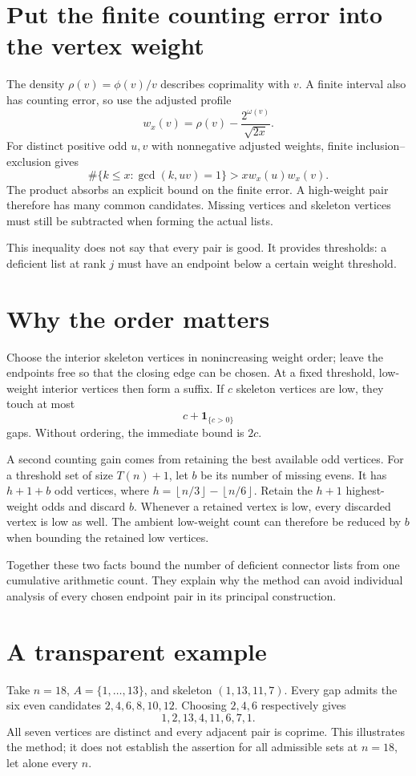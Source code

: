 \documentclass[11pt,letterpaper]{article}
\theoremstyle{remark}\newtheorem{remark}[theorem]{Remark}
\newcommand{\ind}{\mathbf 1}
\newcommand{\floor}[1]{\left\lfloor#1\right\rfloor}
\begin{document}
\section{Put the finite counting error into the vertex weight}
The density $\rho(v)=\phi(v)/v$ describes coprimality with $v$. A finite interval also has counting error, so use the adjusted profile
\[
 w_x(v)=\rho(v)-\frac{2^{\omega(v)}}{\sqrt{2x}}.
\]
For distinct positive odd $u,v$ with nonnegative adjusted weights, finite inclusion--exclusion gives
\[
 \#\{k\le x:\gcd(k,uv)=1\}>xw_x(u)w_x(v).
\]
The product absorbs an explicit bound on the finite error. A high-weight pair therefore has many common candidates. Missing vertices and skeleton vertices must still be subtracted when forming the actual lists.

This inequality does not say that every pair is good. It provides thresholds: a deficient list at rank $j$ must have an endpoint below a certain weight threshold.

\section{Why the order matters}
Choose the interior skeleton vertices in nonincreasing weight order; leave the endpoints free so that the closing edge can be chosen. At a fixed threshold, low-weight interior vertices then form a suffix. If $c$ skeleton vertices are low, they touch at most
\[
 c+\ind_{\{c>0\}}
\]
gaps. Without ordering, the immediate bound is $2c$.

A second counting gain comes from retaining the best available odd vertices. For a threshold set of size $T(n)+1$, let $b$ be its number of missing evens. It has $h+1+b$ odd vertices, where $h=\floor{n/3}-\floor{n/6}$. Retain the $h+1$ highest-weight odds and discard $b$. Whenever a retained vertex is low, every discarded vertex is low as well. The ambient low-weight count can therefore be reduced by $b$ when bounding the retained low vertices.

Together these two facts bound the number of deficient connector lists from one cumulative arithmetic count. They explain why the method can avoid individual analysis of every chosen endpoint pair in its principal construction.

\section{A transparent example}
Take $n=18$, $A=\{1,\ldots,13\}$, and skeleton $(1,13,11,7)$. Every gap admits the six even candidates $2,4,6,8,10,12$. Choosing $2,4,6$ respectively gives
\[
 1,2,13,4,11,6,7,1.
\]
All seven vertices are distinct and every adjacent pair is coprime. This illustrates the method; it does not establish the assertion for all admissible sets at $n=18$, let alone every $n$.
\end{document}
